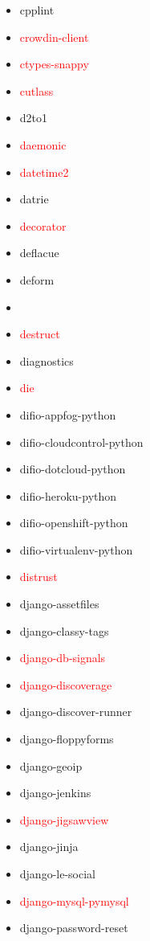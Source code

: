 \documentclass{l4proj}
\begin{document}
\begin{appendices}
{\begin{itemize}
\item cpplint
\item\textcolor{red}{crowdin-client}
\item\textcolor{red}{ctypes-snappy}
\item\textcolor{red}{cutlass}
\item d2to1
\item\textcolor{red}{daemonic}
\end{itemize}
}%
\noindent\parbox[t]{0.32\textwidth}{\raggedright%
\begin{itemize}
\item\textcolor{red}{datetime2}
\item datrie
\item\textcolor{red}{decorator}
\item deflacue
\item deform
\item {}
\item\textcolor{red}{destruct}
\item diagnostics
\item\textcolor{red}{die}
\item difio-appfog-python
\item difio-cloudcontrol-python
\item difio-dotcloud-python
\item difio-heroku-python
\item difio-openshift-python
\item difio-virtualenv-python
\item\textcolor{red}{distrust}
\item django-assetfiles
\item django-classy-tags
\item\textcolor{red}{django-db-signals}
\item\textcolor{red}{django-discoverage}
\item django-discover-runner
\item django-floppyforms
\item django-geoip
\item django-jenkins
\item\textcolor{red}{django-jigsawview}
\item django-jinja
\item django-le-social
\item\textcolor{red}{django-mysql-pymysql}
\item django-password-reset
\end{itemize}
}%
\noindent\parbox[t]{0.32\textwidth}{\raggedright%
}
\end{appendices}
\end{document}
